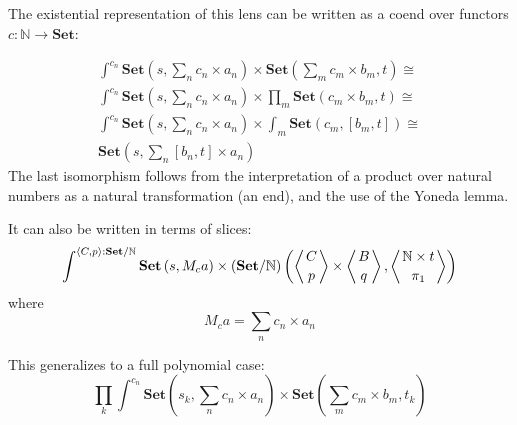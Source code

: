 \documentclass[11pt]{amsart}
\begin{document}
 
 The existential representation of this lens can be written as a coend over functors $c \colon \mathbb{N} \to \mathbf{Set}$:
 
\begin{align*}
\int^{c_n}  \mathbf{Set} (s, \sum_n c_n \times a_n) \times  \mathbf{Set} (\sum_m c_m \times b_m, t) \cong
\\
\int^{c_n}  \mathbf{Set} (s, \sum_n c_n \times a_n) \times  \prod_m \mathbf{Set} ( c_m \times b_m, t) \cong
\\
\int^{c_n}  \mathbf{Set} (s, \sum_n c_n \times a_n) \times  \int_m \mathbf{Set} ( c_m, [b_m, t]) \cong
\\ 
\mathbf{Set} (s, \sum_n [b_n, t] \times a_n)
\end{align*}
The last isomorphism follows from the interpretation of a product over natural numbers as a natural transformation (an end), and the use of the Yoneda lemma.

It can also be written in terms of slices:
\[ \int^{\langle C, p \rangle : \mathbf{Set}/\mathbb{N}} \mathbf{Set} 
\left(s,  M_c a \right)  
  \times (\mathbf{Set}/\mathbb{N})\left( \left \langle {C \atop p} \right \rangle 
  \times \left \langle {B \atop q} \right \rangle, \left \langle {\mathbb{N} \times t \atop \pi_1} \right \rangle \right) \]
 where 
 \[ M_c a = \sum_n c_n \times a_n \]

This generalizes to a full polynomial case:
\[ \prod_k \int^{c_n}  \mathbf{Set} (s_k, \sum_n c_n \times a_n) \times  \mathbf{Set} (\sum_m c_m \times b_m, t_k) \]
\end{document}
